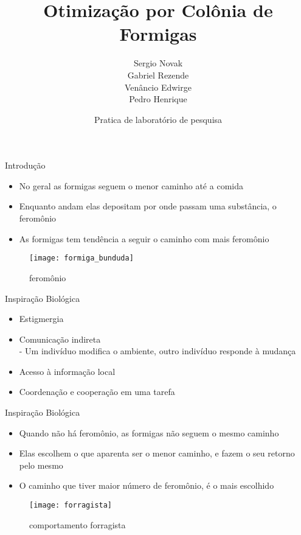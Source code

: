 \documentclass[compress]{beamer}
\title{Otimização por Colônia de Formigas}
\author{Sergio Novak \\ Gabriel Rezende \\ Venâncio Edwirge\\ Pedro Henrique}
\date{Pratica de laboratório de pesquisa}
\begin{document}
\frame{\titlepage}


\begin{frame}{Introdução}
\begin{itemize}
\item{No geral as formigas seguem o menor caminho até a comida}
\newline
\item{Enquanto andam elas depositam por onde passam uma substância, o feromônio}
\newline
\item{As formigas tem tendência a seguir o caminho com mais feromônio}
\end{itemize}

\begin{figure}[!htb]
    \centering
\texttt{[image: formiga\_bunduda]}
    \caption{feromônio}
\end{figure}





\end{frame}

\begin{frame}{Inspiração Biológica}
\begin{itemize}
\item{Estigmergia}
\newline
\item{Comunicação indireta\\ - Um indivíduo modifica o ambiente, outro indivíduo responde à mudança}
\newline
\item{Acesso à informação local}
\newline
\item{Coordenação e cooperação em uma tarefa}
\end{itemize}
\end{frame}

\begin{frame}{Inspiração Biológica}
\begin{itemize}
\item{Quando não há feromônio, as formigas não seguem o mesmo caminho}
\newline
\item{Elas escolhem o que aparenta ser o menor caminho, e fazem o seu retorno pelo mesmo}
\newline
\item{O caminho que tiver maior número de feromônio, é o mais escolhido}
\end{itemize}
\begin{figure}[!htb]
    \centering
\texttt{[image: forragista]}
    \caption{comportamento forragista}
\end{figure}
\end{frame}
\end{document}
